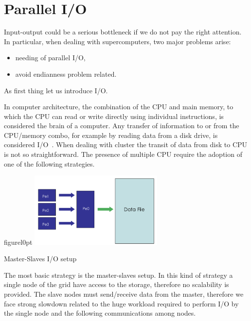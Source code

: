 \section{Parallel I/O}

Input-output could be a serious bottleneck if we do not pay the right attention.
In particular, when dealing with supercomputers, two major problems arise:
\begin{itemize}
\item needing of parallel I/O,
\item avoid endianness problem related.
\end{itemize}
As first thing let us introduce I/O.\par
In computer architecture, the combination of the CPU and main memory, to which the CPU can read or write directly using individual instructions, is considered the brain of a computer. Any transfer of information to or from the CPU/memory combo, for example by reading data from a disk drive, is considered I/O~\cite{io}.
When dealing with cluster the transit of data from disk to CPU is not so straightforward. The presence of multiple CPU require the adoption of one of the following strategies.\par
\begin{wrapfloat}{figure}{l}{0pt}
\includegraphics[width=0.5\textwidth]{grafici/masterslave}
\caption{Master-Slaves I/O setup}
\end{wrapfloat}
The most basic strategy is the master-slaves setup. In this kind of strategy a single node of the grid have access to the storage, therefore no scalability is provided. The slave nodes must send/receive data from the master, therefore we face strong slowdown related to the huge workload required to perform I/O by the single node and the following communications among nodes.\\

